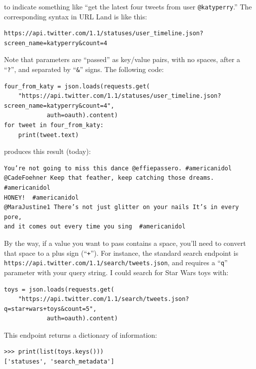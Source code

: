 \documentclass[12pt]{article}
\begin{document}
to indicate something like ``get the latest four tweets from user
\texttt{@katyperry}.'' The corresponding syntax in URL Land is like this:

\footnotesize
\begin{Verbatim}[fontsize=\small,samepage=true,frame=none]
https://api.twitter.com/1.1/statuses/user_timeline.json?screen_name=katyperry&count=4
\end{Verbatim}
\normalsize

Note that parameters are ``passed'' as key/value pairs, with no spaces, after a
``\texttt{?}'', and separated by ``\texttt{\&}'' signs. The following code:

\footnotesize
\begin{Verbatim}[fontsize=\small,samepage=true,frame=none]
four_from_katy = json.loads(requests.get(
    "https://api.twitter.com/1.1/statuses/user_timeline.json?screen_name=katyperry&count=4",
            auth=oauth).content)
for tweet in four_from_katy:
    print(tweet.text)
\end{Verbatim}
\normalsize

produces this result (today):

\begin{Verbatim}[fontsize=\small,samepage=true,frame=none]
You’re not going to miss this dance @effiepassero. #americanidol
@CadeFoehner Keep that feather, keep catching those dreams. #americanidol
HONEY!  #americanidol
@MaraJustine1 There’s not just glitter on your nails It’s in every pore,
and it comes out every time you sing  #americanidol
\end{Verbatim}

By the way, if a value you want to pass contains a space, you'll need to
convert that space to a plus sign (``\texttt{+}''). For instance, the standard
search endpoint is \texttt{https://api.twitter.com/1.1/search/tweets.json},
and requires a ``\texttt{q}'' parameter with your query string. I could search
for Star Wars toys with:

\small
\begin{Verbatim}[fontsize=\small,samepage=true,frame=none]
toys = json.loads(requests.get(
    "https://api.twitter.com/1.1/search/tweets.json?q=star+wars+toys&count=5",
            auth=oauth).content)
\end{Verbatim}
\normalsize

This endpoint returns a dictionary of information:

\begin{Verbatim}[fontsize=\small,samepage=true,frame=none]
>>> print(list(toys.keys()))
['statuses', 'search_metadata']
\end{Verbatim}
\end{document}
